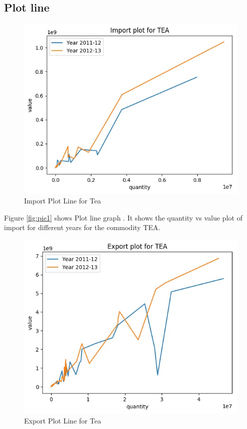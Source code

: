 \documentclass[a4paper,11pt]{article}
\begin{document}
\subsection{Plot line}
\begin{figure}[H]
\centering
\includegraphics[scale=0.80,width=\textwidth]{image5.jpg}
  \caption{Import Plot Line for Tea}
  \label{fig:plot1}
  
  
  
\end{figure}

Figure \ref{fig:pie1} shows Plot line graph . It shows the quantity vs value plot of import for different years for the commodity TEA.


\begin{figure}[H]
\centering
\includegraphics[scale=0.80,width=\textwidth]{image6.jpg}
  \caption{Export Plot Line for Tea}
  \label{fig:plot2}
  
\end{figure}
\end{document}
